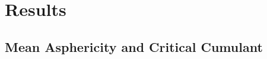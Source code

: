 \documentclass[aps,pre,amssymb,amsmath,twocolumn,floatfix]{revtex4-2}
\begin{document}




\section{Results}

\subsection{Mean Asphericity and Critical Cumulant}


\end{document}
